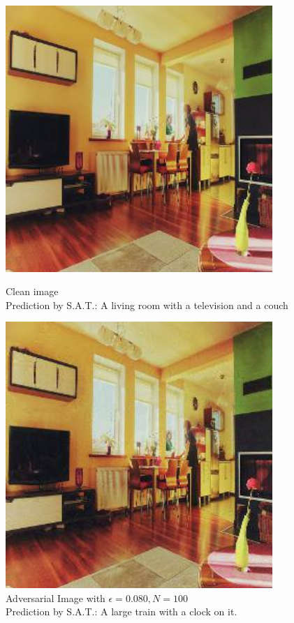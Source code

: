 \begin{figure}[ht]
    \centering
    \begin{minipage}{0.45\textwidth}
        \centering
        \includegraphics[width=0.9\textwidth]{figures/Distract/n=100/samples/0.000/img_0.jpg} %
        \caption*{Clean image\\Prediction by S.A.T.: A living room with a television and a couch}
    \end{minipage}\hfill
    \begin{minipage}{0.45\textwidth}
        \centering
        \includegraphics[width=0.9\textwidth]{figures/Distract/n=100/samples/0.080/img_0.jpg} %
        \caption*{Adversarial Image with $\epsilon=0.080, N=100$\\Prediction by S.A.T.: A large train with a clock on it.}
    \end{minipage}
\end{figure}

